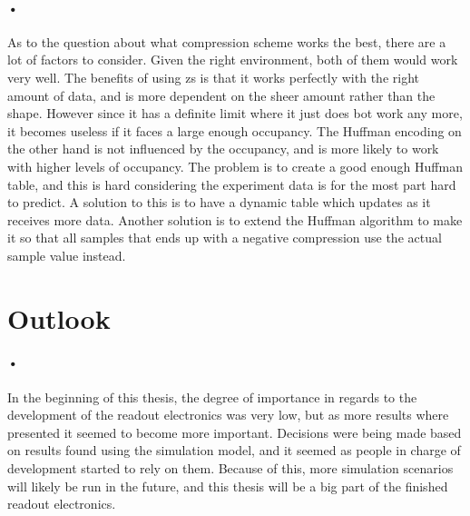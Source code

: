 \documentclass[a4paper, 12pt]{report}
\begin{document}
\paragraph{•}
As to the question about what compression scheme works the best, there are a lot of factors to consider.
Given the right environment, both of them would work very well.
The benefits of using \gls{zs} is that it works perfectly with the right amount of data, and is more dependent on the sheer amount rather than the shape.
However since it has a definite limit where it just does bot work any more, it becomes useless if it faces a large enough occupancy.
The Huffman encoding on the other hand is not influenced by the occupancy, and is more likely to work with higher levels of occupancy.
The problem is to create a good enough Huffman table, and this is hard considering the experiment data is for the most part hard to predict.
A solution to this is to have a dynamic table which updates as it receives more data.
Another solution is to extend the Huffman algorithm to make it so that all samples that ends up with a negative compression use the actual sample value instead.

\section{Outlook}

\paragraph{•}
In the beginning of this thesis, the degree of importance in regards to the development of the readout electronics was very low, but as more results where presented it seemed to become more important.
Decisions were being made based on results found using the simulation model, and it seemed as people in charge of development started to rely on them.
Because of this, more simulation scenarios will likely be run in the future, and this thesis will be a big part of the finished readout electronics.
\end{document}
